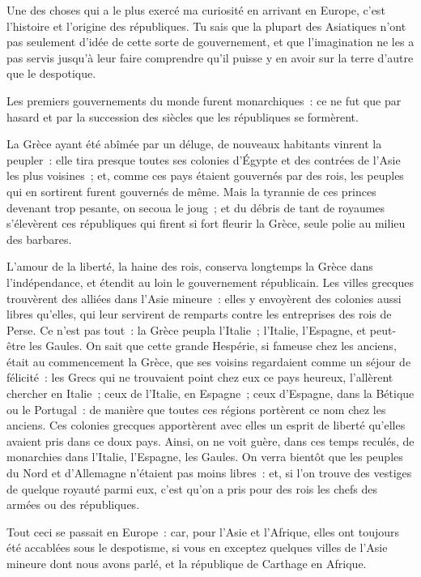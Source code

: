 \documentclass[french,twoside]{book} %
\begin{document}
\noindent Une des choses qui a le plus exercé ma curiosité en arrivant en Europe, c’est l’histoire et l’origine des républiques. Tu sais que la plupart des Asiatiques n’ont pas seulement d’idée de cette sorte de gouvernement, et que l’imagination ne les a pas servis jusqu’à leur faire comprendre qu’il puisse y en avoir sur la terre d’autre que le despotique.\par
Les premiers gouvernements du monde furent monarchiques : ce ne fut que par hasard et par la succession des siècles que les républiques se formèrent.\par
La Grèce ayant été abîmée par un déluge, de nouveaux habitants vinrent la peupler : elle tira presque toutes ses colonies d’Égypte et des contrées de l’Asie les plus voisines ; et, comme ces pays étaient gouvernés par des rois, les peuples qui en sortirent furent gouvernés de même. Mais la tyrannie de ces princes devenant trop pesante, on secoua le joug ; et du débris de tant de royaumes s’élevèrent ces républiques qui firent si fort fleurir la Grèce, seule polie au milieu des barbares.\par
L’amour de la liberté, la haine des rois, conserva longtemps la Grèce dans l’indépendance, et étendit au loin le gouvernement républicain. Les villes grecques trouvèrent des alliées dans l’Asie mineure : elles y envoyèrent des colonies aussi libres qu’elles, qui leur servirent de remparts contre les entreprises des rois de Perse. Ce n’est pas tout : la Grèce peupla l’Italie ; l’Italie, l’Espagne, et peut-être les Gaules. On sait que cette grande Hespérie, si fameuse chez les anciens, était au commencement la Grèce, que ses voisins regardaient comme un séjour de félicité : les Grecs qui ne trouvaient point chez eux ce pays heureux, l’allèrent chercher en Italie ; ceux de l’Italie, en Espagne ; ceux d’Espagne, dans la Bétique ou le Portugal : de manière que toutes ces régions portèrent ce nom chez les anciens. Ces colonies grecques apportèrent avec elles un esprit de liberté qu’elles avaient pris dans ce doux pays. Ainsi, on ne voit guère, dans ces temps reculés, de monarchies dans l’Italie, l’Espagne, les Gaules. On verra bientôt que les peuples du Nord et d’Allemagne n’étaient pas moins libres : et, si l’on trouve des vestiges de quelque royauté parmi eux, c’est qu’on a pris pour des rois les chefs des armées ou des républiques.\par
Tout ceci se passait en Europe : car, pour l’Asie et l’Afrique, elles ont toujours été accablées sous le despotisme, si vous en exceptez quelques villes de l’Asie mineure dont nous avons parlé, et la république de Carthage en Afrique.\par
\end{document}
